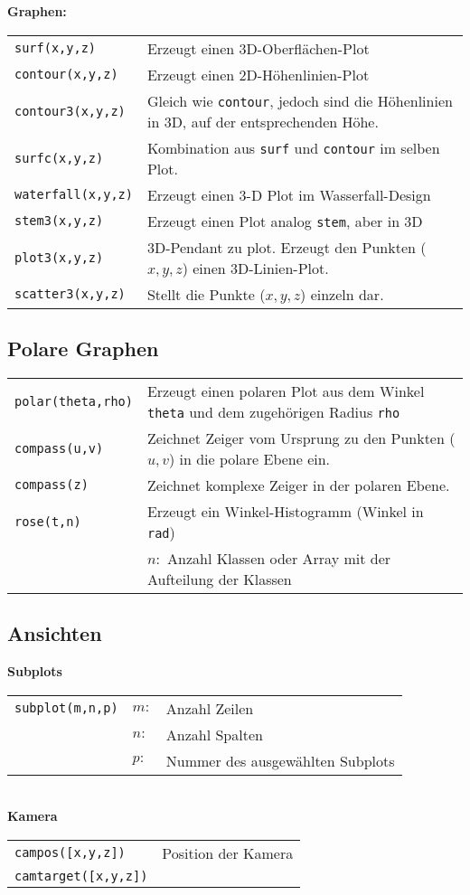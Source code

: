 \textbf{Graphen:} \\
\begin{tabular}{ll}
	\texttt{surf(x,y,z)} & Erzeugt einen 3D-Oberflächen-Plot\\
	\texttt{contour(x,y,z)} & Erzeugt einen 2D-Höhenlinien-Plot\\
	\texttt{contour3(x,y,z)} & Gleich wie \texttt{contour}, jedoch sind die Höhenlinien in 3D, auf der entsprechenden Höhe. \\
	\texttt{surfc(x,y,z)} & Kombination aus \texttt{surf} und \texttt{contour} im selben Plot. \\
	\texttt{waterfall(x,y,z)} & Erzeugt einen 3-D Plot im Wasserfall-Design \\
	\texttt{stem3(x,y,z)} & Erzeugt einen Plot analog \texttt{stem}, aber in 3D \\
	\texttt{plot3(x,y,z)} & 3D-Pendant zu plot. Erzeugt den Punkten ($x,y,z$) einen 3D-Linien-Plot. \\
	\texttt{scatter3(x,y,z)} & Stellt die Punkte ($x,y,z$) einzeln dar. \\
\end{tabular}


\subsection{Polare Graphen}
\begin{tabular}{ll}
	\texttt{polar(theta,rho)} & Erzeugt einen polaren Plot aus dem Winkel \texttt{theta} und dem zugehörigen Radius \texttt{rho} \\
	\texttt{compass(u,v)} & Zeichnet Zeiger vom Ursprung zu den Punkten ($u,v$) in die polare Ebene ein. \\
	\texttt{compass(z)} & Zeichnet komplexe Zeiger in der polaren Ebene. \\
	\texttt{rose(t,n)} & Erzeugt ein Winkel-Histogramm (Winkel in \texttt{rad}) \\ & $n:$ Anzahl Klassen oder Array mit der Aufteilung der Klassen \\
\end{tabular}

\subsection{Ansichten}
\textbf{Subplots} \\
\begin{tabular}{lll}
	\texttt{subplot(m,n,p)} & $m:$ & Anzahl Zeilen \\
							& $n:$ & Anzahl Spalten \\
							& $p:$ & Nummer des ausgewählten Subplots \\
\end{tabular} \\
\textbf{Kamera} \\
\begin{tabular}{ll}
	\texttt{campos([x,y,z])} & Position der Kamera \\
	\texttt{camtarget([x,y,z])} & 
\end{tabular}
